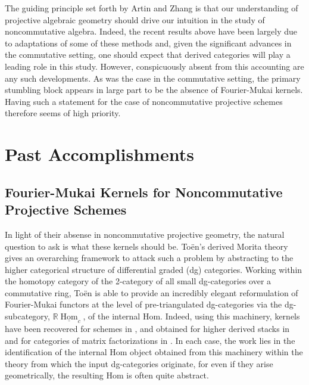 \documentclass[11pt]{amsart}
\begin{document}
The guiding principle set forth by Artin and Zhang is that our understanding of projective algebraic geometry should drive our intuition in the study of noncommutative algebra.
Indeed, the recent results above have been largely due to adaptations of some of these methods and, given the significant advances in the commutative setting, one should expect that derived categories will play a leading role in this study.
However, conspicuously absent from this accounting are any such developments.
As was the case in the commutative setting, the primary stumbling block appears in large part to be the absence of Fourier-Mukai kernels.
Having such a statement for the case of noncommutative projective schemes therefore seems of high priority.

\section*{Past Accomplishments}
\subsection*{Fourier-Mukai Kernels for Noncommutative Projective Schemes}

In light of their absense in noncommutative projective geometry, the natural question to ask is what these kernels should be.
To\"en's derived Morita theory \cite{Toen} gives an overarching framework to attack such a problem by abstracting to the higher categorical structure of differential graded (dg) categories.
Working within the homotopy category of the 2-category of all small dg-categories over a commutative ring, To\"en is able to provide an incredibly elegant reformulation of Fourier-Mukai functors at the level of pre-triangulated dg-categories via the dg-subcategory, $\mathbb{R}\underline{\operatorname{Hom}}_c$, of the internal Hom.
Indeed, using this machinery, kernels have been recovered for schemes in \cite{Toen}, and obtained for higher derived stacks in \cite{BFN} and for categories of matrix factorizations in \cite{dyck,PV,BFK}.
In each case, the work lies in the identification of the internal Hom object obtained from this machinery within the theory from which the input dg-categories originate, for even if they arise geometrically, the resulting Hom is often quite abstract.

\end{document}
